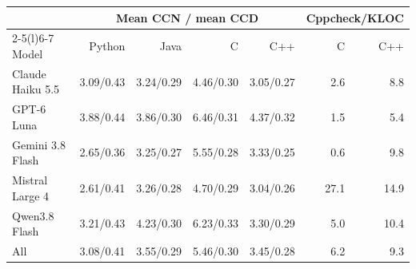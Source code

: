 \begin{tabular}{@{}lrrrrrr@{}}
\toprule
 & \multicolumn{4}{c}{Mean CCN / mean CCD} & \multicolumn{2}{c}{Cppcheck/KLOC} \\
\cmidrule(lr){2-5}\cmidrule(l){6-7}
Model & Python & Java & C & C++ & C & C++ \\
\midrule
Claude Haiku 5.5 & 3.09/0.43 & 3.24/0.29 & 4.46/0.30 & 3.05/0.27 & 2.6 & 8.8 \\
GPT-6 Luna & 3.88/0.44 & 3.86/0.30 & 6.46/0.31 & 4.37/0.32 & 1.5 & 5.4 \\
Gemini 3.8 Flash & 2.65/0.36 & 3.25/0.27 & 5.55/0.28 & 3.33/0.25 & 0.6 & 9.8 \\
Mistral Large 4 & 2.61/0.41 & 3.26/0.28 & 4.70/0.29 & 3.04/0.26 & 27.1 & 14.9 \\
Qwen3.8 Flash & 3.21/0.43 & 4.23/0.30 & 6.23/0.33 & 3.30/0.29 & 5.0 & 10.4 \\
\midrule
All & 3.08/0.41 & 3.55/0.29 & 5.46/0.30 & 3.45/0.28 & 6.2 & 9.3 \\
\bottomrule
\end{tabular}
